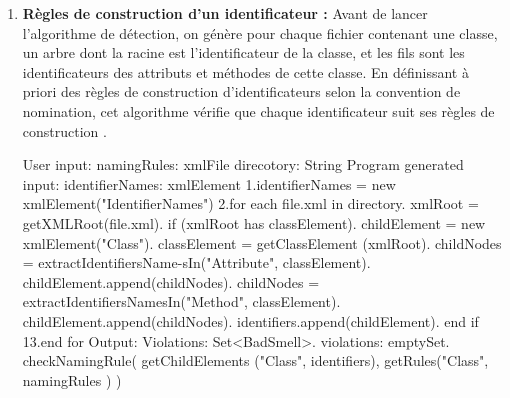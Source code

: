 \begin{enumerate}
\newline




\item \textbf {Règles de construction d’un identificateur :}
Avant de lancer l'algorithme de détection, on génère pour chaque fichier contenant une classe, un arbre dont la racine est l'identificateur de la classe, et les fils sont les identificateurs des attributs et méthodes de cette classe.
En définissant à priori des règles de construction d'identificateurs selon la convention de nomination, cet algorithme vérifie que chaque identificateur suit ses règles de construction \cite{abebe2009lexicon}.
\begin{framed}
  {\selectfont  
User input:\newline
 namingRules: xmlFile\newline
 direcotory: String\newline
 Program generated input:\newline
 identifierNames: xmlElement\newline
 1.identifierNames = new xmlElement("IdentifierNames")\newline
 2.for each file.xml in directory.	xmlRoot = getXMLRoot(file.xml).	if (xmlRoot has classElement).		childElement = new xmlElement("Class").             classElement = getClassElement (xmlRoot).		childNodes = extractIdentifiersName-sIn("Attribute", classElement).		childElement.append(childNodes).             childNodes = extractIdentifiersNamesIn("Method", classElement).		childElement.append(childNodes).		identifiers.append(childElement).	end if\newline
 13.end for\newline
 Output:\newline
 Violations: Set<BadSmell>. violations: emptySet. checkNamingRule( getChildElements ("Class", identifiers), getRules("Class", namingRules ) )\newline
}
\end{framed}
\end{enumerate}
